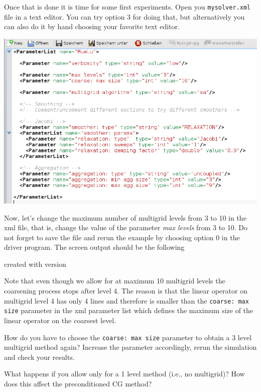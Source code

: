 \documentclass[10pt,fleqn]{book}
\newcommand\printScreenOutput[1]{

{\vspace{-0.3cm}\hfill\tiny{created with \muelu version }}
}
\begin{document}
Once that is done it is time for some first experiments. Open you \texttt{mysolver.xml} file in a text editor. You can try option 3 for doing that, but alternatively you can also do it by hand choosing your favorite text editor.

\begin{center}\includegraphics[width=\textwidth]{pics/tut1_10.png} \end{center}

Now, let's change the maximum number of multigrid levels from 3 to 10 in the xml file, that is, change the value of the parameter \textit{max levels} from 3 to 10. Do not forget to save the file and rerun the example by choosing option 0 in the driver program.
The screen output should be the following

\printScreenOutput{s1_easy_10levels.txt_3.fragment_3.fragment}

Note that even though we allow for at maximum 10 multigrid levels the coarsening process stops after level 4. The reason is that the linear operator on multigrid level 4 has only 4 lines and therefore is smaller than the \texttt{coarse: max size} parameter in the xml parameter list which defines the maximum size of the linear operator on the coarsest level.


\begin{exercise}
How do you have to choose the \texttt{coarse: max size} parameter to obtain a 3 level multigrid method again? Increase the parameter accordingly, rerun the simulation and check your results.
\end{exercise}
\begin{exercise}
What happens if you allow only for a 1 level method (i.e., no multigrid)? How does this affect the preconditioned CG method?
\end{exercise}
\end{document}
